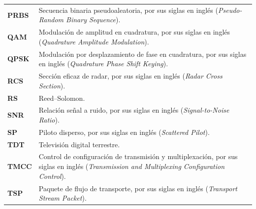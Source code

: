 \documentclass[12pt, letterpaper, oneside]{report}
\begin{document}
\begin{longtable}{>{\bfseries}p{} p{}}
	PRBS  & Secuencia binaria pseudoaleatoria, por sus siglas en inglés (\textit{Pseudo-Random Binary Sequence}).\\
	QAM   & Modulación de amplitud en cuadratura, por sus siglas en inglés (\textit{Quadrature Amplitude Modulation}).\\
	QPSK  & Modulación por desplazamiento de fase en cuadratura, por sus siglas en inglés (\textit{Quadrature Phase Shift Keying}).\\
	RCS   & Sección eficaz de radar, por sus siglas en inglés (\textit{Radar Cross Section}).\\
	RS    & Reed--Solomon.\\
	SNR   & Relación señal a ruido, por sus siglas en inglés (\textit{Signal-to-Noise Ratio}).\\
	SP    & Piloto disperso, por sus siglas en inglés (\textit{Scattered Pilot}).\\
	TDT   & Televisión digital terrestre.\\
	TMCC  & Control de configuración de transmisión y multiplexación, por sus siglas en inglés (\textit{Transmission and Multiplexing Configuration Control}).\\
	TSP   & Paquete de flujo de transporte, por sus siglas en inglés (\textit{Transport Stream Packet}).\\
	\end{longtable}

\cleardoublepage


	\cleardoublepage


	\tableofcontents
	\cleardoublepage

	\listoffigures
	\cleardoublepage


	\renewcommand*\listtablename{Índice de tablas}
	\listoftables
	\cleardoublepage
\end{document}
